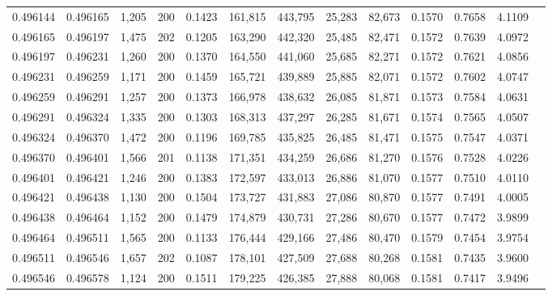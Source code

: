 \begin{tabular}{rrrrrrrrrrrrr}
0.496144 & 0.496165 & 1,205 & 200 &                                     0.1423 & 161,815 & 443,795 &  25,283 &  82,673 & 0.1570 & 0.7658 & 4.1109 \\
0.496165 & 0.496197 & 1,475 & 202 &                                     0.1205 & 163,290 & 442,320 &  25,485 &  82,471 & 0.1572 & 0.7639 & 4.0972 \\
0.496197 & 0.496231 & 1,260 & 200 &                                     0.1370 & 164,550 & 441,060 &  25,685 &  82,271 & 0.1572 & 0.7621 & 4.0856 \\
0.496231 & 0.496259 & 1,171 & 200 &                                     0.1459 & 165,721 & 439,889 &  25,885 &  82,071 & 0.1572 & 0.7602 & 4.0747 \\
0.496259 & 0.496291 & 1,257 & 200 &                                     0.1373 & 166,978 & 438,632 &  26,085 &  81,871 & 0.1573 & 0.7584 & 4.0631 \\
0.496291 & 0.496324 & 1,335 & 200 &                                     0.1303 & 168,313 & 437,297 &  26,285 &  81,671 & 0.1574 & 0.7565 & 4.0507 \\
0.496324 & 0.496370 & 1,472 & 200 &                                     0.1196 & 169,785 & 435,825 &  26,485 &  81,471 & 0.1575 & 0.7547 & 4.0371 \\
0.496370 & 0.496401 & 1,566 & 201 &                                     0.1138 & 171,351 & 434,259 &  26,686 &  81,270 & 0.1576 & 0.7528 & 4.0226 \\
0.496401 & 0.496421 & 1,246 & 200 &                                     0.1383 & 172,597 & 433,013 &  26,886 &  81,070 & 0.1577 & 0.7510 & 4.0110 \\
0.496421 & 0.496438 & 1,130 & 200 &                                     0.1504 & 173,727 & 431,883 &  27,086 &  80,870 & 0.1577 & 0.7491 & 4.0005 \\
0.496438 & 0.496464 & 1,152 & 200 &                                     0.1479 & 174,879 & 430,731 &  27,286 &  80,670 & 0.1577 & 0.7472 & 3.9899 \\
0.496464 & 0.496511 & 1,565 & 200 &                                     0.1133 & 176,444 & 429,166 &  27,486 &  80,470 & 0.1579 & 0.7454 & 3.9754 \\
0.496511 & 0.496546 & 1,657 & 202 &                                     0.1087 & 178,101 & 427,509 &  27,688 &  80,268 & 0.1581 & 0.7435 & 3.9600 \\
0.496546 & 0.496578 & 1,124 & 200 &                                     0.1511 & 179,225 & 426,385 &  27,888 &  80,068 & 0.1581 & 0.7417 & 3.9496 \\

\end{tabular}
